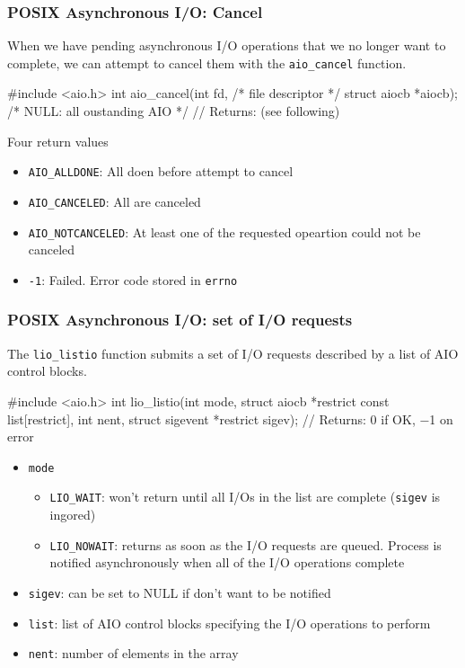 \documentclass[newPxFont,sthlmFooter,nooffset]{beamer}
\begin{document}
\begin{frame}[t, fragile]
  \frametitle{POSIX Asynchronous I/O: Cancel}
When we have pending asynchronous I/O operations that we no longer want to complete, we can attempt to cancel them with the \texttt{aio\_cancel} function.

\begin{codedef}
#include <aio.h>
int aio_cancel(int fd, /* file descriptor */
              struct aiocb *aiocb); /* NULL: all oustanding AIO */
// Returns: (see following)
\end{codedef}

Four return values
\begin{itemize}
\item \texttt{AIO\_ALLDONE}: All doen before attempt to cancel
\item \texttt{AIO\_CANCELED}: All are canceled
\item \texttt{AIO\_NOTCANCELED}: At least one of the requested opeartion could not be canceled
\item \texttt{-1}: Failed. Error code stored in \texttt{errno}
\end{itemize}

\end{frame}

\begin{frame}[t, fragile]
  \frametitle{POSIX Asynchronous I/O: set of I/O requests}
 The \texttt{lio\_listio} function submits a set of I/O requests described by a list of AIO control blocks.
 \begin{codedef}
#include <aio.h>
int lio_listio(int mode, struct aiocb *restrict const list[restrict],
               int nent, struct sigevent *restrict sigev);
// Returns: 0 if OK, −1 on error
 \end{codedef}

 \begin{itemize}
 \item \texttt{mode}
   \begin{itemize}
   \item \texttt{LIO\_WAIT}: won't return until all I/Os in the list are complete (\texttt{sigev} is ingored)
   \item \texttt{LIO\_NOWAIT}: returns as soon as the I/O requests are queued. Process is notified asynchronously when all of the I/O operations complete
   \end{itemize}
 \item \texttt{sigev}: can be set to NULL if don't want to be notified
 \item \texttt{list}: list of AIO control blocks specifying the I/O operations to perform
 \item \texttt{nent}: number of elements in the array
 \end{itemize}

\end{frame}
\end{document}
